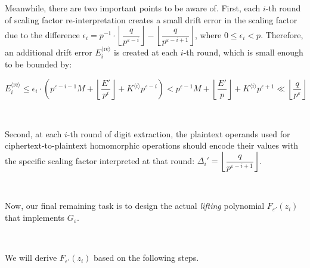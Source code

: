 Meanwhile, there are two important points to be aware of. First, each $i$-th round of scaling factor re-interpretation creates a small drift error in the scaling factor due to the difference $\epsilon_i = p^{-1}\cdot \left\lfloor\dfrac{q}{p^{\varepsilon - i}}\right\rfloor - \left\lfloor\dfrac{q}{p^{\varepsilon - i + 1}}\right\rfloor$, where $0 \leq \epsilon_{i} < p$. Therefore, an additional drift error $E_i^{\langle \text{re} \rangle}$ is created at each $i$-th round, which is small enough to be bounded by: 

$E_i^{\langle \text{re} \rangle} \leq \epsilon_i\cdot (p^{\varepsilon - i-1}M + \left\lfloor\dfrac{E'}{p^{i}}\right\rfloor + K^{\langle i \rangle} p^{\varepsilon - i}) < p^{\varepsilon-1}M + \left\lfloor\dfrac{E'}{p}\right\rfloor + K^{\langle i \rangle}p^{\varepsilon + 1} \ll \left\lfloor\dfrac{q}{p^{\varepsilon}}\right\rfloor$

$ $

Second, at each $i$-th round of digit extraction, the plaintext operands used for ciphertext-to-plaintext homomorphic operations should encode their values with the specific scaling factor interpreted at that round: $\Delta_i' = \left\lfloor\dfrac{q}{p^{\varepsilon-i+1}}\right\rfloor$. 

$ $

Now, our final remaining task is to design the actual \textit{lifting} polynomial $F_{\varepsilon'}(z_i)$ that implements $G_{\varepsilon}$.  

$ $

 We will derive $F_{\varepsilon'}(z_i)$ based on the following steps. 

